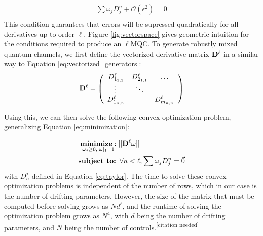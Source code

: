 \documentclass[aps,nofootinbib,pra,notitlepage,twocolumn]{revtex4-1}
\newcommand{\needcite}{{\color{blue}\textsuperscript{[citation needed]}}}
\begin{document}
\begin{equation}\label{eq:MQC-relaxed}
\begin{gathered}
\sum\omega_jD^n_j + \mathcal{O}(\epsilon^2) = 0\\
\end{gathered}
\end{equation}
This condition guarantees that errors will be supressed quadratically for all derivatives up to order $\ell$. %
 Figure \ref{fig:vectorspace} gives geometric intuition for the conditions required to produce an $\ell$MQC. To generate robustly mixed quantum channels, we first define the vectorized derivative matrix ${\bold{D}^{\ell}}$ in a similar way to Equation \ref{eq:vectorized_generators}:
\begin{equation}
{\bold{D}^{\ell}} =  \left(\begin{array}{cccc}
		D^\ell_{1_{1,1}} & D^\ell_{2_{1,1}} & \ldots   \\ 
		\vdots\ & \ddots &    \\
		D^\ell_{1_{n,n}} &  &  D^\ell_{m_{n,n}} \\ 
	\end{array} 	
	\right)
\end{equation}

Using this, we can then solve the following convex optimization problem, generalizing Equation \ref{eq:minimization}:

\begin{equation}\label{eq:robust_minimization}
  \begin{split}
    &\underset{\omega_j\geq0, |\omega|_1=1}{\textbf{minimize}: } ||{\bold{D}^{\ell}}\omega||\\
    &\textbf{subject to: } \forall n<\ell, \sum \omega_jD_j^n=\vec{0}\\
  \end{split}
\end{equation}
with $D_n^j$ defined in Equation \ref{eq:taylor}. The time to solve these convex optimization problems is independent of the number of rows, which in our case is the number of drifting parameters. However, the size of the matrix that must be computed before solving grows as $Nd^{\ell}$, and the runtime of solving the optimization problem grows as $N^4$, with $d$ being the number of drifting parameters, and $N$ being the number of controls.\needcite
\end{document}
